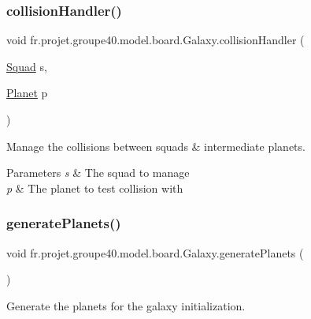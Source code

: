 \subsubsection{\texorpdfstring{collision\+Handler()}{collisionHandler()}}
{\footnotesize\ttfamily void fr.\+projet.\+groupe40.\+model.\+board.\+Galaxy.\+collision\+Handler (\begin{DoxyParamCaption}\item[{\hyperlink{classfr_1_1projet_1_1groupe40_1_1model_1_1ships_1_1_squad}{Squad}}]{s,  }\item[{\hyperlink{classfr_1_1projet_1_1groupe40_1_1model_1_1board_1_1_planet}{Planet}}]{p }\end{DoxyParamCaption})}



Manage the collisions between squads \& intermediate planets. 


\begin{DoxyParams}{Parameters}
{\em s} & The squad to manage \\
\hline
{\em p} & The planet to test collision with \\
\hline
\end{DoxyParams}
\mbox{\label{classfr_1_1projet_1_1groupe40_1_1model_1_1board_1_1_galaxy_aff898566fd28de2e9af973395d063790}} 
\subsubsection{\texorpdfstring{generate\+Planets()}{generatePlanets()}}
{\footnotesize\ttfamily void fr.\+projet.\+groupe40.\+model.\+board.\+Galaxy.\+generate\+Planets (\begin{DoxyParamCaption}{ }\end{DoxyParamCaption})}



Generate the planets for the galaxy initialization. 

\mbox{\label{classfr_1_1projet_1_1groupe40_1_1model_1_1board_1_1_galaxy_a587e7baee3f8b1d8806346c100168bac}} 
